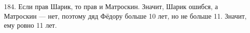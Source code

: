 184. Если прав Шарик, то прав и Матроскин. Значит, Шарик ошибся, а Матроскин --- нет, поэтому дяд Фёдору больше 10 лет, но не больше 11. Значит, ему ровно 11 лет.\\
